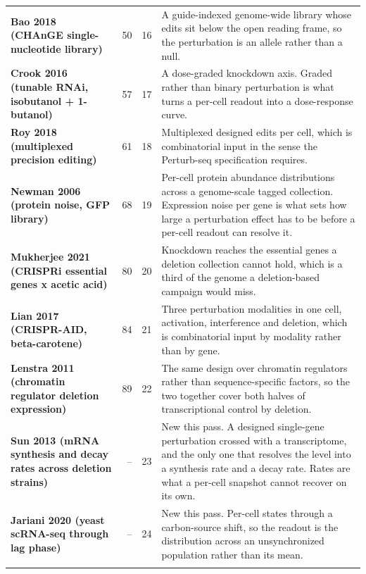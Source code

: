\begin{longtable}{@{}L{46mm} r@{\hspace{6pt}} r@{\hspace{6pt}} L{104mm}@{}}
\addlinespace[5pt]
\textbf{Bao 2018 (CHAnGE single-nucleotide library)} & 50 & 16 & A guide-indexed genome-wide library whose edits sit below the open reading frame, so the perturbation is an allele rather than a null. \\
\addlinespace[5pt]
\textbf{Crook 2016 (tunable RNAi, isobutanol + 1-butanol)} & 57 & 17 & A dose-graded knockdown axis. Graded rather than binary perturbation is what turns a per-cell readout into a dose-response curve. \\
\addlinespace[5pt]
\textbf{Roy 2018 (multiplexed precision editing)} & 61 & 18 & Multiplexed designed edits per cell, which is combinatorial input in the sense the Perturb-seq specification requires. \\
\addlinespace[5pt]
\textbf{Newman 2006 (protein noise, GFP library)} & 68 & 19 & Per-cell protein abundance distributions across a genome-scale tagged collection. Expression noise per gene is what sets how large a perturbation effect has to be before a per-cell readout can resolve it. \\
\addlinespace[5pt]
\textbf{Mukherjee 2021 (CRISPRi essential genes x acetic acid)} & 80 & 20 & Knockdown reaches the essential genes a deletion collection cannot hold, which is a third of the genome a deletion-based campaign would miss. \\
\addlinespace[5pt]
\textbf{Lian 2017 (CRISPR-AID, beta-carotene)} & 84 & 21 & Three perturbation modalities in one cell, activation, interference and deletion, which is combinatorial input by modality rather than by gene. \\
\addlinespace[5pt]
\textbf{Lenstra 2011 (chromatin regulator deletion expression)} & 89 & 22 & The same design over chromatin regulators rather than sequence-specific factors, so the two together cover both halves of transcriptional control by deletion. \\
\addlinespace[5pt]
\textbf{Sun 2013 (mRNA synthesis and decay rates across deletion strains)} & -- & 23 & New this pass. A designed single-gene perturbation crossed with a transcriptome, and the only one that resolves the level into a synthesis rate and a decay rate. Rates are what a per-cell snapshot cannot recover on its own. \\
\addlinespace[5pt]
\textbf{Jariani 2020 (yeast scRNA-seq through lag phase)} & -- & 24 & New this pass. Per-cell states through a carbon-source shift, so the readout is the distribution across an unsynchronized population rather than its mean. \\
\addlinespace[5pt]

\end{longtable}
